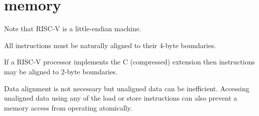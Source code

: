 \section{memory}

Note that RISC-V is a little-endian machine.  

All instructions must be naturally aligned to their 4-byte 
boundaries.~\cite[p.~5]{rvismv1v22:2017}

If a RISC-V processor implements the C (compressed) extension then 
instructions may be aligned to 2-byte 
boundaries.\cite[p.~68]{rvismv1v22:2017}

Data alignment is not necessary but unaligned data can be inefficient.  
Accessing unaligned data using any of the load or store instructions can 
also prevent a memory access from operating 
atomically.~\cite[p.19]{rvismv1v22:2017}



%

